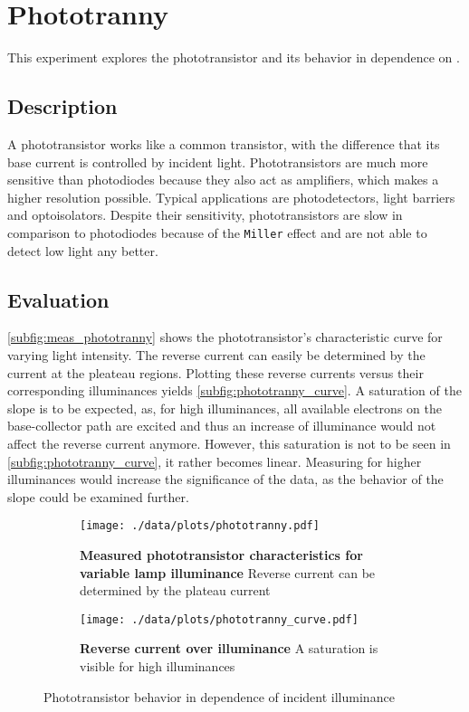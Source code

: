\chapter{Phototranny}
This experiment explores the phototransistor and its behavior in dependence on .

\section{Description}
A phototransistor works like a common transistor, with the difference that its base current is controlled by incident light.
Phototransistors are much more sensitive than photodiodes because they also act as amplifiers, which makes a higher resolution possible.
Typical applications are photodetectors, light barriers and optoisolators.
Despite their sensitivity, phototransistors are slow in comparison to photodiodes because of the \texttt{Miller} effect and are not able to detect low light any better.

\section{Evaluation}
\autoref{subfig:meas_phototranny} shows the phototransistor's characteristic curve for varying light intensity.
The reverse current can easily be determined by the current at the pleateau regions.
Plotting these reverse currents versus their corresponding illuminances yields \autoref{subfig:phototranny_curve}.
A saturation of the slope is to be expected, as, for high illuminances, all available electrons on the base-collector path are excited and thus an increase of illuminance would not affect the reverse current anymore.
However, this saturation is not to be seen in \autoref{subfig:phototranny_curve}, it rather becomes linear.
Measuring for higher illuminances would increase the significance of the data, as the behavior of the slope could be examined further.

\begin{figure}[btp]
	\centering
	\begin{subfigure}{0.4\textwidth}
		\centering
		\texttt{[image: ./data/plots/phototranny.pdf]}
		\caption[Measured phototransistor characteristics for variable lamp illuminance]{\textbf{Measured phototransistor characteristics for variable lamp illuminance} Reverse current can be determined by the plateau current}
		\label{subfig:meas_phototranny}
	\end{subfigure}\quad
	\begin{subfigure}{0.4\textwidth}
		\centering
		\texttt{[image: ./data/plots/phototranny\_curve.pdf]}
		\caption[Reverse current over illuminance]{\textbf{Reverse current over illuminance} A saturation is visible for high illuminances}
		\label{subfig:phototranny_curve}
	\end{subfigure}
	\caption{Phototransistor behavior in dependence of incident illuminance}
\end{figure}

